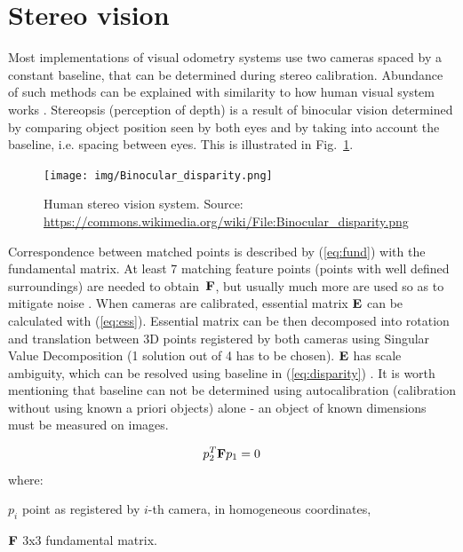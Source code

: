 
\section{Stereo vision}
\label{sec:stereo}

Most implementations of visual odometry systems use two cameras spaced by a constant baseline, that can be determined during stereo calibration. Abundance of such methods can be explained with similarity to how human visual system works \cite{cyganek}. Stereopsis (perception of depth) is a result of binocular vision determined by comparing object position seen by both eyes and by taking into account the baseline, i.e. spacing between eyes. This is illustrated in Fig.~\ref{fig:stereo}.

\begin{figure}[ht]
	\centering\texttt{[image: img/Binocular\_disparity.png]}
	\caption{Human stereo vision system. Source: \url{https://commons.wikimedia.org/wiki/File:Binocular_disparity.png}}
	\label{fig:stereo}
\end{figure}

Correspondence between matched points is described by (\ref{eq:fund}) with the fundamental matrix. At least 7 matching feature points (points with well defined surroundings) are needed to obtain~$\textbf{F}$, but usually much more are used so as to mitigate noise \cite{zhang1998determining}. When cameras are calibrated, essential matrix $\textbf{E}$ can be calculated with (\ref{eq:ess}). Essential matrix can be then decomposed into rotation and translation between 3D points registered by both cameras using Singular Value Decomposition (1 solution out of 4 has to be chosen). $\textbf{E}$ has scale ambiguity, which can be resolved using baseline in (\ref{eq:disparity}) \cite{improving}. It is worth mentioning that baseline can not be determined using autocalibration (calibration without using known a priori objects) alone - an object of known dimensions must be measured on images.

\begin{equation}
p_{2}^{T}\textbf{F}p_{1}=0
\label{eq:fund}
\end{equation}
where:
\begin{eqwhere}[2cm]
	\item[$p_{i}$] point as registered by $i$-th camera, in homogeneous coordinates,
	\item[$\textbf{F}$] 3x3 fundamental matrix.
\end{eqwhere}


